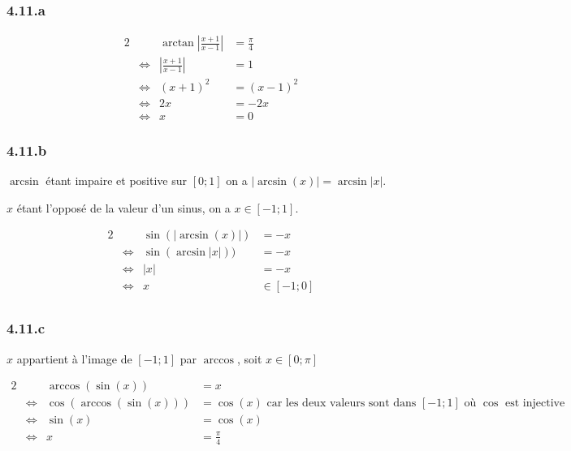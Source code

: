 \documentclass[a4paper,10pt]{report}
\begin{document}
\subsubsection*{4.11.a}

\begin{alignat*}{2}
	&                    & \arctan \left| \frac{x+1}{x-1} \right|  &= \frac{\pi}{4} \\
	&\Longleftrightarrow & \left| \frac{x+1}{x-1} \right|          &= 1 \\
	&\Longleftrightarrow &                                 (x+1)^2 &= (x-1)^2 \\
	&\Longleftrightarrow &                                      2x &= -2x \\
	&\Longleftrightarrow &                                       x &= 0
\end{alignat*}

\subsubsection*{4.11.b}

$\arcsin$ étant impaire et positive sur $[0 ; 1]$ on a $|\arcsin(x)| = \arcsin |x|$.

$x$ étant l'opposé de la valeur d'un sinus, on a $x \in [-1 ; 1]$.

\begin{alignat*}{2}
	&                    & \sin(|\arcsin (x)|) &= -x \\
	&\Longleftrightarrow & \sin(\arcsin |x|))  &= -x \\
	&\Longleftrightarrow &                |x|  &= -x \\
	&\Longleftrightarrow &                   x & \in [-1 ; 0]  \\
\end{alignat*}

\subsubsection*{4.11.c}

$x$ appartient à l'image de $[-1; 1]$ par $\arccos$, soit $x \in [0 ; \pi]$

\begin{alignat*}{2}
	&                    & \arccos(\sin(x))       &= x \\
	&\Longleftrightarrow & \cos(\arccos(\sin(x))) &= \cos(x) \text{ car les deux valeurs sont dans $[-1;1]$ où $\cos$ est injective} \\
	&\Longleftrightarrow &                \sin(x) &= \cos(x) \\
	&\Longleftrightarrow &                      x &= \frac{\pi}{4} \\
\end{alignat*}	
\end{document}
